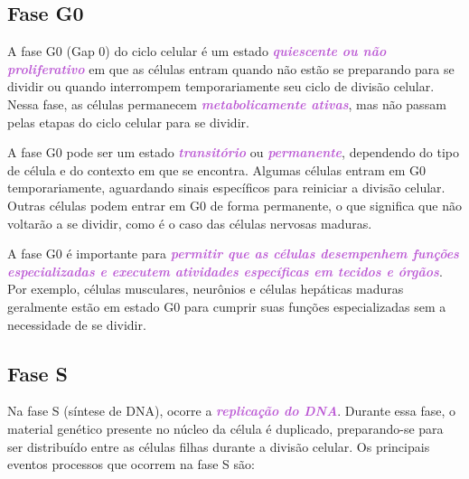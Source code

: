 \documentclass[11pt,a4paper]{article}
\newcounter{exemplo}
\begin{document}
\subsection*{Fase G0}

	A fase G0 (Gap 0) do ciclo celular é um estado \textcolor{MediumOrchid}{\textbf{\textit{quiescente ou não proliferativo}}} em que as células entram quando não estão se preparando para se dividir ou quando interrompem temporariamente seu ciclo de divisão celular. Nessa fase, as células permanecem \textcolor{MediumOrchid}{\textbf{\textit{metabolicamente ativas}}}, mas não passam pelas etapas do ciclo celular para se dividir.

	A fase G0 pode ser um estado \textcolor{MediumOrchid}{\textbf{\textit{transitório}}} ou \textcolor{MediumOrchid}{\textbf{\textit{permanente}}}, dependendo do tipo de célula e do contexto em que se encontra. Algumas células entram em G0 temporariamente, aguardando sinais específicos para reiniciar a divisão celular. Outras células podem entrar em G0 de forma permanente, o que significa que não voltarão a se dividir, como é o caso das células nervosas maduras.

	A fase G0 é importante para \textcolor{MediumOrchid}{\textbf{\textit{permitir que as células desempenhem funções especializadas e executem atividades específicas em tecidos e órgãos}}}. Por exemplo, células musculares, neurônios e células hepáticas maduras geralmente estão em estado G0 para cumprir suas funções especializadas sem a necessidade de se dividir.

	
\subsection*{Fase S}

	Na fase S (síntese de DNA), ocorre a \textcolor{MediumOrchid}{\textbf{\textit{replicação do DNA}}}. Durante essa fase, o material genético presente no núcleo da célula é duplicado, preparando-se para ser distribuído entre as células filhas durante a divisão celular. Os principais eventos processos que ocorrem na fase S são:
\end{document}
